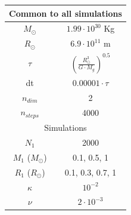 \documentclass[a4paper,12pt]{article}
\begin{document}
\begin{figure}[ht!]
\centering
\begin{tabular}{|c|c|}
\hline
\multicolumn{2}{|c|}{Common to all simulations}\\
\hline \hline
 $M_\odot$ & $1.99\cdot 10^{30}$ Kg\\
 $R_\odot$ & $6.9\cdot10^{11}$ m\\
 $\tau$ & $(\frac{R_\odot^3}{G\cdot M_g})^{0.5}$\\
 dt & $0.00001\cdot\tau$\\
 $n_{dim}$ & 2\\
 $n_{steps}$ & 4000\\
 \hline\hline
 \multicolumn{2}{|c|}{Simulations}\\
 \hline\hline
 $N_1$ & 2000\\
 $M_1$ ($M_\odot$) & 0.1, 0.5, 1\\
 $R_1$ ($R_\odot$) & 0.1, 0.3, 0.7, 1\\
 \hline
 $\kappa$ & $10^{-2}$\\
 $\nu$ & $2\cdot10^{-3}$\\
 \hline
\end{tabular}
\end{figure}
\end{document}
